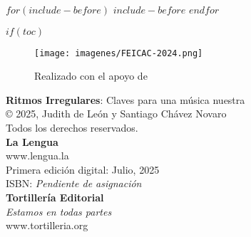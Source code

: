 \documentclass[
$for(babel-otherlangs)$
  $babel-otherlangs$,
$endfor$
$if(babel-lang)$
  $babel-lang$,
$endif$
$if(fontsize)$
  $fontsize$,
$endif$
$if(papersize)$
  $papersize$paper,
$endif$
$for(classoption)$
  $classoption$$sep$,
$endfor$
]{$documentclass$}
\begin{document}
\thispagestyle{empty}
\clearpage

\begin{titlepage}
    \centering
    \vspace*{6cm}
\end{titlepage}

\clearpage


\clearpage

$for(include-before)$
$include-before$
$endfor$


$if(toc)$

  \clearpage
  \begin{titlepage}
    \centering
    \vspace*{2cm}
    \raggedright
    \begin{figure}[H]
    \centering
    \caption*{Realizado con el apoyo de}
    \texttt{[image: imagenes/FEICAC-2024.png]}
    \end{figure}
    \vspace*{1cm}
    \textbf{Ritmos Irregulares}: Claves para una música nuestra \\
    \vspace*{1cm}
    © 2025, Judith de León y Santiago Chávez Novaro \\
    Todos los derechos reservados. \\
    \textbf{La Lengua} \\
    www.lengua.la \\
    \vspace*{1cm}
    Primera edición digital: Julio, 2025 \\
    \vspace*{1cm}
    ISBN: \textit{Pendiente de asignación} \\
    \vspace*{1cm}
    \textbf{Tortillería Editorial} \\
    \textit{Estamos en todas partes} \\
    www.tortilleria.org
  \end{titlepage}
\end{document}
